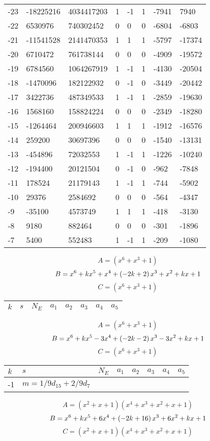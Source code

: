 \documentclass{amsart}
\begin{document}
\begin{longtable}{|l|l|l|lllll|}
-23&-18225216&4034417203&1&-1&1&-7941&7940\\
-22&6530976&740302452&0&0&0&-6804&-6803\\
-21&-11541528&2141470353&1&1&1&-5797&-17374\\
-20&6710472&761738144&0&0&0&-4909&-19572\\
-19&6784560&1064267919&1&-1&1&-4130&-20504\\
-18&-1470096&182122932&0&-1&0&-3449&-20442\\
-17&3422736&487349533&1&-1&1&-2859&-19630\\
-16&1568160&158824224&0&0&0&-2349&-18280\\
-15&-1264464&200946603&1&1&1&-1912&-16576\\
-14&259200&30697396&0&0&0&-1540&-13131\\
-13&-454896&72032553&1&-1&1&-1226&-10240\\
-12&-194400&20121504&0&-1&0&-962&-7848\\
-11&178524&21179143&1&-1&1&-744&-5902\\
-10&29376&2584692&0&0&0&-564&-4347\\
-9&-35100&4573749&1&1&1&-418&-3130\\
-8&9180&882464&0&0&0&-301&-1896\\
-7&5400&552483&1&-1&1&-209&-1080\\
\hline
\end{longtable}
$$A=(x^6
 + x^3
 + 1)$$
$$B=x^6
 + k\*x^5
 + x^4
 + \left(-2\*k
 + 2\right) \*x^3
 + x^2
 + k\*x
 + 1$$
$$C=(x^6
 + x^3
 + 1)$$
\begin{longtable}{|l|l|l|lllll|}
\hline
$k$ & $s$ & $N_E$ & $a_1$ & $a_2$ & $a_3$ & $a_4$ & $a_5$\\
\hline
\hline
\end{longtable}
$$A=(x^6
 + x^3
 + 1)$$
$$B=x^6
 + k\*x^5
 - 3\*x^4
 + \left(-2\*k
 - 2\right) \*x^3
 - 3\*x^2
 + k\*x
 + 1$$
$$C=(x^6
 + x^3
 + 1)$$
\begin{longtable}{|l|l|l|lllll|}
\hline
$k$ & $s$ & $N_E$ & $a_1$ & $a_2$ & $a_3$ & $a_4$ & $a_5$\\
\hline
-1&$m=1/9d_{15}+2/9d_{7}$&&\multicolumn{5}{c|}{}\\
\hline
\end{longtable}
$$A=(x^2
 + x
 + 1)(x^4
 + x^3
 + x^2
 + x
 + 1)$$
$$B=x^6
 + k\*x^5
 + 6\*x^4
 + \left(-2\*k
 + 16\right) \*x^3
 + 6\*x^2
 + k\*x
 + 1$$
$$C=(x^2
 + x
 + 1)(x^4
 + x^3
 + x^2
 + x
 + 1)$$
\end{document}
